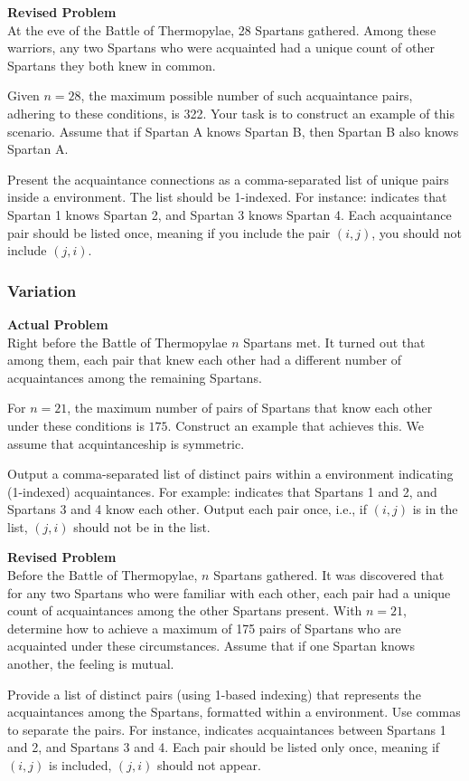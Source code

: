 \textbf{Revised Problem}\\
At the eve of the Battle of Thermopylae, 28 Spartans gathered. Among these warriors, any two Spartans who were acquainted had a unique count of other Spartans they both knew in common. 

Given $n=28$, the maximum possible number of such acquaintance pairs, adhering to these conditions, is 322. Your task is to construct an example of this scenario. Assume that if Spartan A knows Spartan B, then Spartan B also knows Spartan A.

Present the acquaintance connections as a comma-separated list of unique pairs inside a \boxed environment. The list should be 1-indexed. For instance:  indicates that Spartan 1 knows Spartan 2, and Spartan 3 knows Spartan 4. Each acquaintance pair should be listed once, meaning if you include the pair $(i, j)$, you should not include $(j, i)$.

\subsubsection{Variation}
\textbf{Actual Problem}\\
Right before the Battle of Thermopylae $n$ Spartans met. It turned out that among them, each pair that knew each other had a different number of acquaintances among the remaining Spartans.

For $n=21$, the maximum number of pairs of Spartans that know each other under these conditions is $175$. Construct an example that achieves this. We assume that acquintanceship is symmetric.


Output a comma-separated list of distinct pairs within a \boxed environment indicating (1-indexed) acquaintances. For example:  indicates that Spartans 1 and 2, and Spartans 3 and 4 know each other. Output each pair once, i.e., if $(i, j)$ is in the list, $(j, i)$ should not be in the list.

\textbf{Revised Problem}\\
Before the Battle of Thermopylae, $n$ Spartans gathered. It was discovered that for any two Spartans who were familiar with each other, each pair had a unique count of acquaintances among the other Spartans present. With $n=21$, determine how to achieve a maximum of 175 pairs of Spartans who are acquainted under these circumstances. Assume that if one Spartan knows another, the feeling is mutual.

Provide a list of distinct pairs (using 1-based indexing) that represents the acquaintances among the Spartans, formatted within a \boxed environment. Use commas to separate the pairs. For instance,  indicates acquaintances between Spartans 1 and 2, and Spartans 3 and 4. Each pair should be listed only once, meaning if $(i, j)$ is included, $(j, i)$ should not appear.

